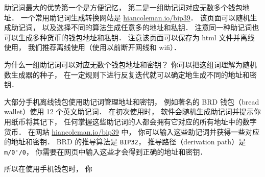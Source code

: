 助记词最大的优势第一个是方便记忆， 第二是一组助记词对应无数多个钱包地址． 一个常用助记词生成转换网站是 \href{https://iancoleman.io/bip39/}{hiancoleman.io/bip39}． 该页面可以随机生成助记词， 以及选择不同的算法生成任意多的地址和私钥． 注意同一种助记词也可以生成多种货币的钱包地址和私钥． 注意该页面可以保存为 html 文件并离线使用， 我们推荐离线使用（使用以前断开网线和 wifi）．

为什么一组助记词可以对应无数个钱包地址和密钥？ 你可以把这组词理解为随机数生成器的种子， 在一定规则下进行反复迭代就可以确定地生成不同的地址和密钥．

大部分手机离线钱包使用助记词管理地址和密钥， 例如著名的 BRD 钱包（bread wallet）使用 12 个英文助记词． 在初次使用时， 软件会随机生成助记词并提示你用纸币将其记下， 任何掌握这些助记词的人都会拥有它对应的所有地址中的数字货币． 在网站 \href{https://iancoleman.io/bip39/}{hiancoleman.io/bip39} 中， 你可以输入这些助记词并获得一些对应的地址和密钥． BRD 的推导算法是 \verb|BIP32|， 推导路径（derivation path）是 \verb|m/0'/0|， 你需要在网页中输入这些才会得到正确的地址和密钥．

所以在使用手机钱包时， 你

